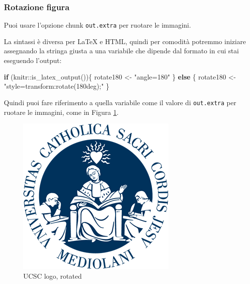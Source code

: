 \documentclass[a4paper, 11pt, nobind]{templates/ociamthesis}
\newenvironment{Shaded}{\begin{snugshade}}{\end{snugshade}}
\newcommand{\ControlFlowTok}[1]{\textcolor[rgb]{0.13,0.29,0.53}{\textbf{#1}}}
\newcommand{\FunctionTok}[1]{\textcolor[rgb]{0.00,0.00,0.00}{#1}}
\newcommand{\NormalTok}[1]{#1}
\newcommand{\OtherTok}[1]{\textcolor[rgb]{0.56,0.35,0.01}{#1}}
\newcommand{\SpecialCharTok}[1]{\textcolor[rgb]{0.00,0.00,0.00}{#1}}
\newcommand{\StringTok}[1]{\textcolor[rgb]{0.31,0.60,0.02}{#1}}
\renewenvironment{Shaded}
{
  \vspace{10pt}%
  \begin{snugshade}%
}{%
  \end{snugshade}%
  \vspace{8pt}%
}
\begin{document}
\hypertarget{rotazione-figura}{%
\subsubsection*{Rotazione figura}\label{rotazione-figura}}

Puoi usare l'opzione chunk \texttt{out.extra} per ruotare le immagini.

La sintassi è diversa per LaTeX e HTML, quindi per comodità potremmo iniziare assegnando la stringa giusta a una variabile che dipende dal formato in cui stai eseguendo l'output:

\begin{Shaded}
\begin{Highlighting}[]
\ControlFlowTok{if}\NormalTok{ (knitr}\SpecialCharTok{::}\FunctionTok{is\_latex\_output}\NormalTok{())\{}
\NormalTok{  rotate180 }\OtherTok{\textless{}{-}} \StringTok{"angle=180"}
\NormalTok{\} }\ControlFlowTok{else}\NormalTok{ \{}
\NormalTok{  rotate180 }\OtherTok{\textless{}{-}} \StringTok{"style=\textquotesingle{}transform:rotate(180deg);\textquotesingle{}"}
\NormalTok{\}}
\end{Highlighting}
\end{Shaded}

Quindi puoi fare riferimento a quella variabile come il valore di \texttt{out.extra} per ruotare le immagini, come in Figura \ref{fig:catto-logo-rotated}.

\begin{figure}

{\centering \includegraphics[width=0.5\linewidth,angle=180]{figures/sample-content/cattolica-logo} 

}

\caption{UCSC logo, rotated}\label{fig:catto-logo-rotated}
\end{figure}
\end{document}
